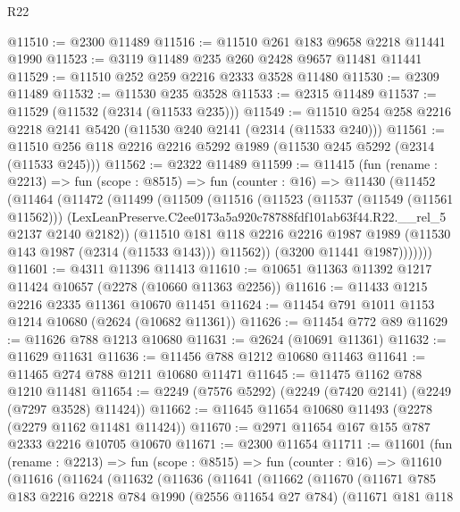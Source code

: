 \begin{lexlean}{R22}
\begin{coremodule}
@11510 := @2300 @11489
@11516 := @11510 @261 @183 @9658 @2218 @11441 @1990
@11523 := @3119 @11489 @235 @260 @2428 @9657 @11481 @11441
@11529 := @11510 @252 @259 @2216 @2333 @3528 @11480
@11530 := @2309 @11489
@11532 := @11530 @235 @3528
@11533 := @2315 @11489
@11537 := @11529 (@11532 (@2314 (@11533 @235)))
@11549 := @11510 @254 @258 @2216 @2218 @2141 @5420 (@11530 @240 @2141 (@2314 (@11533 @240)))
@11561 := @11510 @256 @118 @2216 @2216 @5292 @1989 (@11530 @245 @5292 (@2314 (@11533 @245)))
@11562 := @2322 @11489
@11599 := @11415
    (fun (rename : @2213) =>
    fun (scope : @8515) =>
    fun (counter : @16) =>
    @11430
      (@11452
        (@11464
          (@11472
            (@11499
              (@11509
                (@11516
                  (@11523
                    (@11537 (@11549 (@11561 @11562)))
                    (LexLeanPreserve.C2ee0173a5a920c78788fdf101ab63f44.R22.__rel_5
                      @2137
                      @2140
                      @2182))
                  (@11510
                    @181
                    @118
                    @2216
                    @2216
                    @1987
                    @1989
                    (@11530 @143 @1987 (@2314 (@11533 @143)))
                    @11562))
                (@3200 @11441 @1987)))))))
@11601 := @4311 @11396 @11413
@11610 := @10651 @11363 @11392 @1217 @11424 @10657 (@2278 (@10660 @11363 @2256))
@11616 := @11433 @1215 @2216 @2335 @11361 @10670 @11451
@11624 := @11454 @791 @1011 @1153 @1214 @10680 (@2624 (@10682 @11361))
@11626 := @11454 @772 @89
@11629 := @11626 @788 @1213 @10680
@11631 := @2624 (@10691 @11361)
@11632 := @11629 @11631
@11636 := @11456 @788 @1212 @10680 @11463
@11641 := @11465 @274 @788 @1211 @10680 @11471
@11645 := @11475 @1162 @788 @1210 @11481
@11654 := @2249 (@7576 @5292) (@2249 (@7420 @2141) (@2249 (@7297 @3528) @11424))
@11662 := @11645 @11654 @10680 @11493 (@2278 (@2279 @1162 @11481 @11424))
@11670 := @2971 @11654 @167 @155 @787 @2333 @2216 @10705 @10670
@11671 := @2300 @11654
@11711 := @11601
    (fun (rename : @2213) =>
    fun (scope : @8515) =>
    fun (counter : @16) =>
    @11610
      (@11616
        (@11624
          (@11632
            (@11636
              (@11641
                (@11662
                  (@11670
                    (@11671
                      @785
                      @183
                      @2216
                      @2218
                      @784
                      @1990
                      (@2556 @11654 @27 @784)
                      (@11671
                        @181
                        @118

\end{coremodule}
\end{lexlean}
